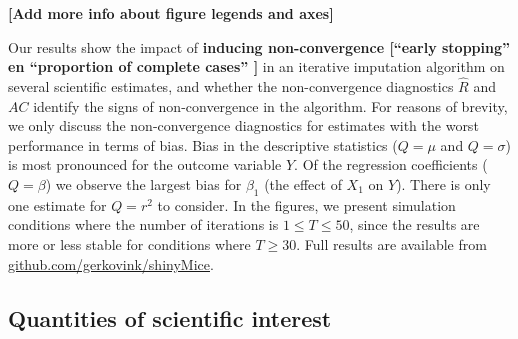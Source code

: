 \documentclass[Royal,times,sageh]{sagej}
\begin{document}
\textbf{{[}Add more info about figure legends and axes{]}}

Our results show the impact of \textbf{inducing non-convergence {[}``early stopping'' en ``proportion of complete cases'' {]}} in an iterative imputation algorithm on several scientific estimates, and whether the non-convergence diagnostics \(\widehat{R}\) and \(AC\) identify the signs of non-convergence in the algorithm. For reasons of brevity, we only discuss the non-convergence diagnostics for estimates with the worst performance in terms of bias. Bias in the descriptive statistics (\(Q=\mu\) and \(Q=\sigma\)) is most pronounced for the outcome variable \(Y\). Of the regression coefficients (\(Q=\beta\)) we observe the largest bias for \(\beta_1\) (the effect of \(X_1\) on \(Y\)). There is only one estimate for \(Q=r^2\) to consider. In the figures, we present simulation conditions where the number of iterations is \(1 \leq T\leq50\), since the results are more or less stable for conditions where \(T \geq 30\). Full results are available from \href{https://github.com/gerkovink/shinyMice/tree/master/3.Thesis/1.SimulationStudy}{github.com/gerkovink/shinyMice}.

\hypertarget{quantities-of-scientific-interest}{%
\subsection{Quantities of scientific interest}\label{quantities-of-scientific-interest}}
\end{document}
